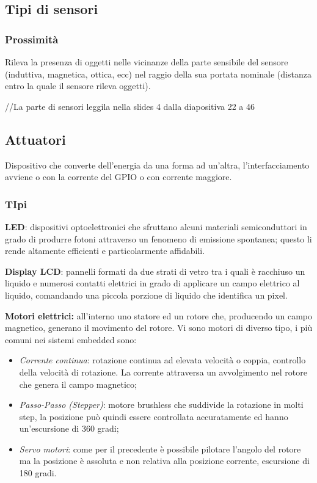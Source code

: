 \subsection{Tipi di sensori}\label{tipi-di-sensori}

\subsubsection{Prossimità}\label{prossimituxe0}

Rileva la presenza di oggetti nelle vicinanze della parte sensibile del
sensore (induttiva, magnetica, ottica, ecc) nel raggio della sua portata
nominale (distanza entro la quale il sensore rileva oggetti).

//La parte di sensori leggila nella slides 4 dalla diapositiva 22 a 46

\subsection{Attuatori}\label{attuatori}

Dispositivo che converte dell'energia da una forma ad un'altra,
l'interfacciamento avviene o con la corrente del GPIO o con corrente
maggiore.

\subsubsection{TIpi}\label{tipi}

\textbf{LED}: dispositivi optoelettronici che sfruttano alcuni materiali
semiconduttori in grado di produrre fotoni attraverso un fenomeno di
emissione spontanea; questo li rende altamente efficienti e
particolarmente affidabili.

\textbf{Display LCD}: pannelli formati da due strati di vetro tra i
quali è racchiuso un liquido e numerosi contatti elettrici in grado di
applicare un campo elettrico al liquido, comandando una piccola porzione
di liquido che identifica un pixel.

\textbf{Motori elettrici:} all'interno uno statore ed un rotore che,
producendo un campo magnetico, generano il movimento del rotore. Vi sono
motori di diverso tipo, i più comuni nei sistemi embedded sono:

\begin{itemize}
\item
  \emph{Corrente continua}: rotazione continua ad elevata velocità o
  coppia, controllo della velocità di rotazione. La corrente attraversa
  un avvolgimento nel rotore che genera il campo magnetico;
\item
  \emph{Passo-Passo (Stepper)}: motore brushless che suddivide la
  rotazione in molti step, la posizione può quindi essere controllata
  accuratamente ed hanno un'escursione di 360 gradi;
\item
  \emph{Servo motori}: come per il precedente è possibile pilotare
  l'angolo del rotore ma la posizione è assoluta e non relativa alla
  posizione corrente, escursione di 180 gradi.
\end{itemize}

